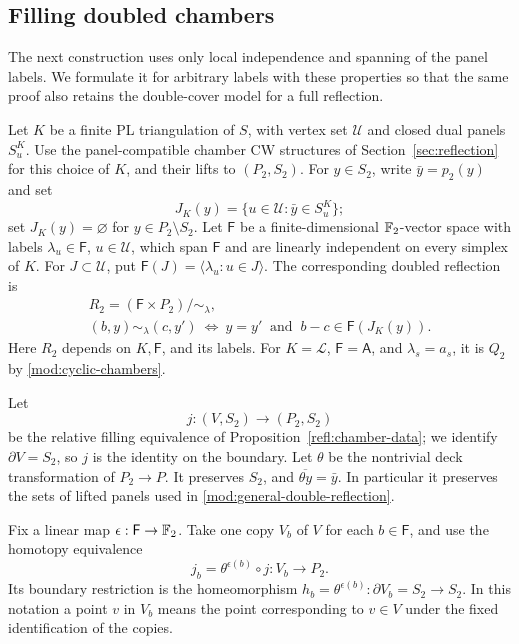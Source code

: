\subsection{Filling doubled chambers}

The next construction uses only local independence and spanning of
the panel labels.  We formulate it for arbitrary labels with these
properties so that the same proof also retains the double-cover model
for a full reflection.

Let \(K\) be a finite PL triangulation of \(S\), with vertex set
\(\mathcal U\) and closed dual panels \(S^K_u\).  Use the
panel-compatible chamber CW structures of
Section~\ref{sec:reflection} for this choice of \(K\), and their
lifts to \((P_2,S_2)\).  For \(y\in S_2\),
write \(\bar y=p_2(y)\) and set
\[
 J_K(y)=\{u\in\mathcal U:\bar y\in S^K_u\};
\]
set \(J_K(y)=\varnothing\) for \(y\in P_2\setminus S_2\).
Let \(\mathsf F\) be a finite-dimensional \(\mathbb F_2\)-vector space with
labels \(\lambda_u\in\mathsf F\), \(u\in\mathcal U\), which span
\(\mathsf F\) and are linearly independent on every simplex of \(K\).
For \(J\subset\mathcal U\), put
\(\mathsf F(J)=\langle\lambda_u:u\in J\rangle\).  The corresponding
doubled reflection is
\begin{equation}\label{mod:general-double-reflection}
 \begin{gathered}
 R_2=(\mathsf F\times P_2)/\sim_\lambda,\\
 (b,y)\sim_\lambda(c,y')
 \ \Longleftrightarrow\
 y=y'\ \text{ and }\ b-c\in\mathsf F(J_K(y)).
 \end{gathered}
\end{equation}
Here \(R_2\) depends on \(K,\mathsf F\), and its labels.  For
\(K=\mathcal L\), \(\mathsf F=\mathsf A\), and \(\lambda_s=a_s\), it is \(Q_2\)
by \eqref{mod:cyclic-chambers}.

Let
\[
 j:(V,S_2)\longrightarrow(P_2,S_2)
\]
be the relative filling equivalence of
Proposition~\ref{refl:chamber-data}; we identify \(\partial V=S_2\),
so \(j\) is the identity on the boundary.  Let \(\theta\) be the
nontrivial deck transformation of \(P_2\to P\).  It preserves \(S_2\),
and \(\overline{\theta y}=\bar y\).  In particular it preserves the
sets of lifted panels used in \eqref{mod:general-double-reflection}.

Fix a linear map \(\epsilon:\mathsf F\to\mathbb F_2\).  Take one copy \(V_b\)
of \(V\) for each \(b\in\mathsf F\), and use the homotopy equivalence
\begin{equation}\label{mod:twisted-chamber-maps}
 j_b=\theta^{\epsilon(b)}\circ j:V_b\longrightarrow P_2.
\end{equation}
Its boundary restriction is the homeomorphism
\(h_b=\theta^{\epsilon(b)}:\partial V_b=S_2\to S_2\).  In this
notation a point \(v\) in \(V_b\) means the point corresponding to
\(v\in V\) under the fixed identification of the copies.

